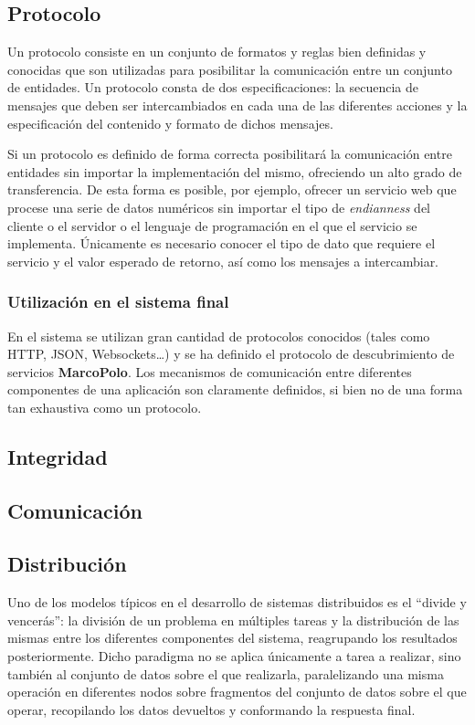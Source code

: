\subsection{Protocolo}

Un protocolo consiste en un conjunto de formatos y reglas bien definidas y conocidas que son utilizadas para posibilitar la comunicación entre un conjunto de entidades. Un protocolo consta de dos especificaciones: la secuencia de mensajes que deben ser intercambiados en cada una de las diferentes acciones y la especificación del contenido y formato de dichos mensajes.

Si un protocolo es definido de forma correcta posibilitará la comunicación entre entidades sin importar la implementación del mismo, ofreciendo un alto grado de transferencia. De esta forma es posible, por ejemplo, ofrecer un servicio web que procese una serie de datos numéricos sin importar el tipo de \textit{endianness} del cliente o el servidor o el lenguaje de programación en el que el servicio se implementa. Únicamente es necesario conocer el tipo de dato que requiere el servicio y el valor esperado de retorno, así como los mensajes a intercambiar.

\subsubsection{Utilización en el sistema final}
En el sistema se utilizan gran cantidad de protocolos conocidos (tales como HTTP, JSON, Websockets\dots) y se ha definido el protocolo de descubrimiento de servicios \textbf{MarcoPolo}. Los mecanismos de comunicación entre diferentes componentes de una aplicación son claramente definidos, si bien no de una forma tan exhaustiva como un protocolo.

\subsection{Integridad}

\subsection{Comunicación}

\subsection{Distribución}

Uno de los modelos típicos en el desarrollo de sistemas distribuidos es el ``divide y vencerás'': la división de un problema en múltiples tareas y la distribución de las mismas entre los diferentes componentes del sistema, reagrupando los resultados posteriormente. Dicho paradigma no se aplica únicamente a tarea a realizar, sino también al conjunto de datos sobre el que realizarla, paralelizando una misma operación en diferentes nodos sobre fragmentos del conjunto de datos sobre el que operar, recopilando los datos devueltos y conformando la respuesta final.


